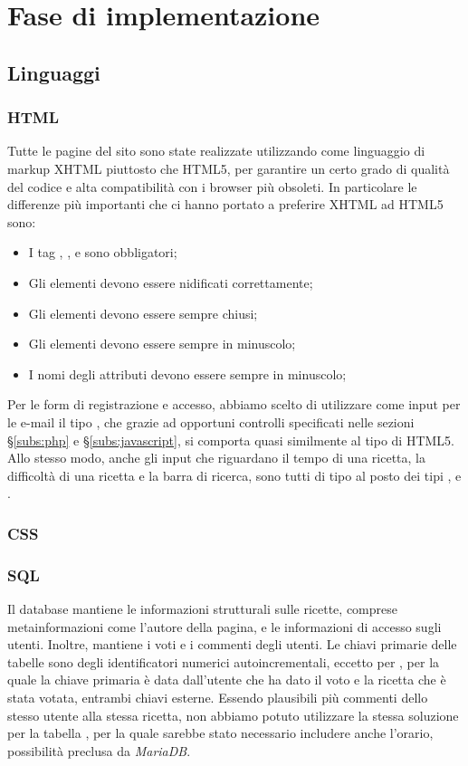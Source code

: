 \section{Fase di implementazione}
\label{sec:fase_di_implementazione}
\subsection{Linguaggi}
\subsubsection{HTML}
Tutte le pagine del sito sono state realizzate utilizzando come linguaggio di markup XHTML piuttosto che HTML5, per garantire un certo grado di qualità del codice e alta compatibilità con i browser più obsoleti. In particolare le differenze più importanti che ci hanno portato a preferire XHTML ad HTML5 sono:
\begin{itemize}
	\item I tag , ,  e  sono obbligatori;
	\item Gli elementi devono essere nidificati correttamente;
	\item Gli elementi devono essere sempre chiusi;
	\item Gli elementi devono essere sempre in minuscolo;
	\item I nomi degli attributi devono essere sempre in minuscolo;
\end{itemize}
Per le form di registrazione e accesso, abbiamo scelto di utilizzare come input per le e-mail il tipo , che grazie ad opportuni controlli specificati nelle sezioni \S\ref{subs:php} e \S\ref{subs:javascript}, si comporta quasi similmente al tipo  di HTML5. Allo stesso modo, anche gli input che riguardano il tempo di una ricetta, la difficoltà di una ricetta e la barra di ricerca, sono tutti di tipo  al posto dei tipi ,  e .

\subsubsection{CSS}

\subsubsection{SQL}
Il database mantiene le informazioni strutturali sulle ricette, comprese metainformazioni come l'autore della pagina, e le informazioni di accesso sugli utenti.
Inoltre, mantiene i voti e i commenti degli utenti.
Le chiavi primarie delle tabelle sono degli identificatori numerici autoincrementali, eccetto per , per la quale la chiave primaria è data dall'utente che ha dato il voto e la ricetta che è stata votata, entrambi chiavi esterne.
Essendo plausibili più commenti dello stesso utente alla stessa ricetta, non abbiamo potuto utilizzare la stessa soluzione per la tabella , per la quale sarebbe stato necessario includere anche l'orario, possibilità preclusa da \textit{MariaDB}.

